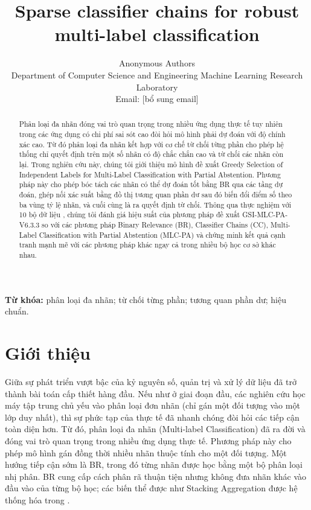 \documentclass[11pt,a4paper]{article}
\begin{document}
\title{\textbf{Sparse classifier chains for robust multi-label classification}}
\author{Anonymous Authors\\[0.35em]\small Department of Computer Science and Engineering
Machine Learning Research Laboratory\\\small Email: [bổ sung email]}
\date{}
\maketitle


\begin{abstract}
Phân loại đa nhãn đóng vai trò quan trọng trong nhiều ứng dụng thực tế tuy nhiên trong các ứng dụng có chi phí sai sót cao đòi hỏi mô hình phải dự đoán với độ chính xác cao. Từ đó phân loại đa nhãn kết hợp với cơ chế từ chối từng phần cho phép hệ thống chỉ quyết định trên một số nhãn có độ chắc chắn cao và từ chối các nhãn còn lại. Trong nghiên cứu này, chúng tôi giới thiệu mô hình đề xuất Greedy Selection of Independent Labels for Multi-Label Classification with Partial Abstention. Phương pháp này cho phép bóc tách các nhãn có thể dự đoán tốt bằng BR qua các tầng dự đoán, ghép nối xác suất bằng đồ thị tương quan phần dư sau đó biến đổi điểm số theo ba vùng tỷ lệ nhãn, và cuối cùng là ra quyết định từ chối. Thông qua thực nghiệm với 10 bộ dữ liệu , chúng tôi đánh giá hiệu suất của phương pháp đề xuất GSI-MLC-PA-V6.3.3 so với các phương pháp Binary Relevance (BR), Classifier Chains (CC), Multi-Label Classification with Partial Abstention (MLC-PA) và chứng minh kết quả cạnh tranh mạnh mẽ với các phương pháp khác ngay cả trong nhiều bộ học cơ sở khác nhau.
\end{abstract}
\noindent\textbf{Từ khóa:} phân loại đa nhãn; từ chối từng phần; tương quan phần dư; hiệu chuẩn.

\section{Giới thiệu}
Giữa sự phát triển vượt bậc của kỷ nguyên số, quản trị và xử lý dữ liệu đã trở thành bài toán cấp thiết hàng đầu. Nếu như ở giai đoạn đầu, các nghiên cứu học máy tập trung chủ yếu vào phân loại đơn nhãn (chỉ gán một đối tượng vào một lớp duy nhất), thì sự phức tạp của thực tế đã nhanh chóng đòi hỏi các tiếp cận toàn diện hơn. Từ đó, phân loại đa nhãn (Multi-label Classification) đã ra đời và đóng vai trò quan trọng trong nhiều ứng dụng thực tế. Phương pháp này cho phép mô hình gán đồng thời nhiều nhãn thuộc tính cho một đối tượng. Một hướng tiếp cận sớm là BR, trong đó từng nhãn được học bằng một bộ phân loại nhị phân. BR cung cấp cách phân rã thuận tiện nhưng không đưa nhãn khác vào đầu vào của từng bộ học; các biến thể được như Stacking Aggregation được hệ thống hóa trong \cite{br2018}.
\end{document}
